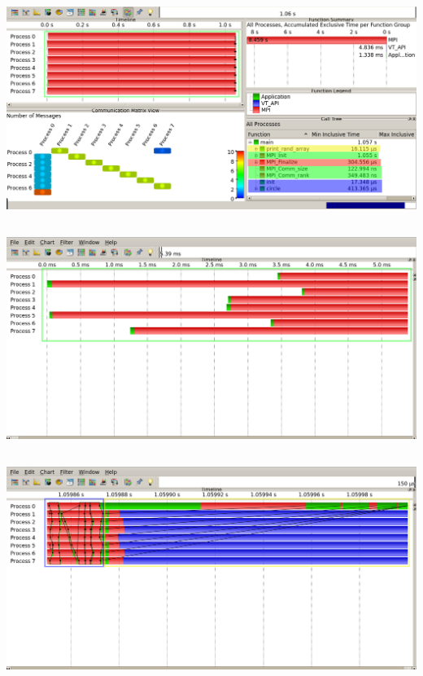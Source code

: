 \documentclass[fleqn]{article}
\begin{document}
\subsection{}%
\includegraphics[width=\textwidth]{vampir1}

\subsection{}%
\includegraphics[width=\textwidth]{vampir2}

\subsection{}%
\includegraphics[width=\textwidth]{vampir3}
\end{document}

